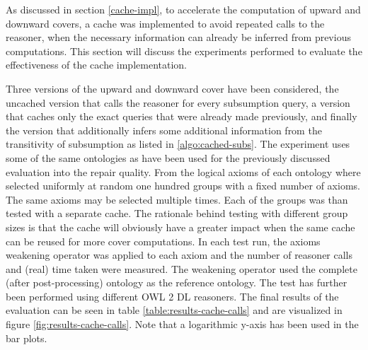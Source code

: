 
As discussed in section \cref{cache-impl}, to accelerate the computation of upward and downward covers, a cache was implemented to avoid repeated calls to the reasoner, when the necessary information can already be inferred from previous computations. This section will discuss the experiments performed to evaluate the effectiveness of the cache implementation.

Three versions of the upward and downward cover have been considered, the uncached version that calls the reasoner for every subsumption query, a version that caches only the exact queries that were already made previously, and finally the version that additionally infers some additional information from the transitivity of subsumption as listed in \cref{algo:cached-subs}. The experiment uses some of the same ontologies as have been used for the previously discussed evaluation into the repair quality. From the logical axioms of each ontology where selected uniformly at random one hundred groups with a fixed number of axioms. The same axioms may be selected multiple times. Each of the groups was than tested with a separate cache. The rationale behind testing with different group sizes is that the cache will obviously have a greater impact when the same cache can be reused for more cover computations. In each test run, the axioms weakening operator was applied to each axiom and the number of reasoner calls and (real) time taken were measured. The weakening operator used the complete (after post-processing) ontology as the reference ontology. The test has further been performed using different OWL 2 DL reasoners. The final results of the evaluation can be seen in table \cref{table:results-cache-calls} and are visualized in figure \cref{fig:results-cache-calls}. Note that a logarithmic y-axis has been used in the bar plots.

